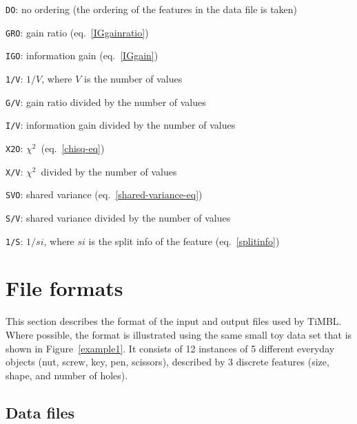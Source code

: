 \documentclass{report}
\newcommand{\chisq}{{$ \chi^2 $}}
\begin{document}
\begin{description}
	\begin{description}
         \item {\tt DO}: no ordering (the ordering of the features 
		in the data file is taken)
         \item {\tt GRO}: gain ratio (eq.~\ref{IGgainratio})
         \item {\tt IGO}: information gain (eq.~\ref{IGgain})
         \item {\tt 1/V}: $1/V$, where $V$ is the number
		of values
         \item {\tt G/V}: gain ratio divided by the number
		of values
         \item {\tt I/V}: information gain divided by the
		number of values
         \item {\tt X2O}: \chisq \ (eq.~\ref{chisq-eq})
         \item {\tt X/V}: \chisq \ divided by the number of
		values
         \item {\tt SVO}: shared variance 
		(eq.~\ref{shared-variance-eq})
         \item {\tt S/V}: shared variance divided by the
		number of values
         \item {\tt 1/S}: $1/si$, where $si$ is the split
		info of the feature (eq.~\ref{splitinfo})
	\end{description}




\end{description}

\section{File formats}
\label{fileformats}

This section describes the format of the input and output files used
by TiMBL. Where possible, the format is illustrated using the same
small toy data set that is shown in Figure~\ref{example1}. It consists
of 12 instances of 5 different everyday objects (nut, screw, key, pen,
scissors), described by 3 discrete features (size, shape, and number
of holes).

\subsection{Data files}
\label{dataformats}
\end{document}
